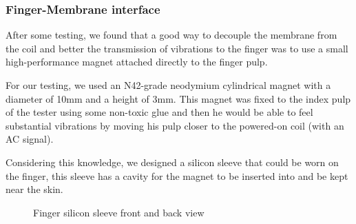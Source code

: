 \subsubsection{Finger-Membrane interface}
After some testing, we found that a good way to decouple the membrane from the coil and better the transmission of vibrations to the finger was to use a small high-performance magnet attached directly to the finger pulp.

For our testing, we used an N42-grade neodymium cylindrical magnet with a diameter of 10mm and a height of 3mm.
This magnet was fixed to the index pulp of the tester using some non-toxic glue and then he would be able to feel substantial vibrations by moving his pulp closer to the powered-on coil (with an AC signal).

Considering this knowledge, we designed a silicon sleeve that could be worn on the finger, this sleeve has a cavity for the magnet to be inserted into and be kept near the skin.
\begin{figure}
    \centering
    \caption{Finger silicon sleeve front and back view}
    \label{fig: finger_sleeve}
\end{figure}

